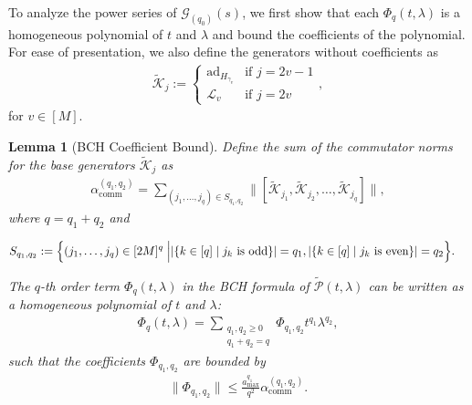 \documentclass[aps,pra,reprint,groupedaddress,floatfix]{revtex4-2}
\newtheorem{lemma}{Lemma}
\newcommand{\ad}{\mathrm{ad}}
\renewcommand{\P}{\mathcal{P}}
\newcommand{\G}{\mathcal{G}}
\renewcommand{\comm}{\mathrm{comm}}
\newcommand{\mc}{\mathcal}
\begin{document}
To analyze the power series of $\G_{(q_0)}(s)$, we first show that each $\Phi_q(t,\lambda)$ is a homogeneous polynomial of $t$ and $\lambda$ and bound the coefficients of the polynomial. For ease of presentation, we also define the generators without coefficients as
\begin{align}
\label{eq:def-K-tilde}
 	\tilde{\mathcal{K}}_j := \begin{cases}\ad_{H_{\gamma_v}} & \text{if } j = 2v-1\\ \mathcal{L}_v & \text{if } j = 2v \end{cases},
\end{align}
for $v \in [M]$.
\begin{lemma}[BCH Coefficient Bound]
\label{lem:bch-bound}
 	Define the sum of the commutator norms for the base generators $\tilde{\mc K}_j$ as
 	\begin{align}
 	\label{eq:alpha-q-q}
 	\alpha_{\comm}^{(q_1, q_2)}=\sum_{(j_1, \ldots, j_q)\in S_{q_1, q_2}}\big\|[\tilde{\mc K}_{j_1}, \tilde{\mc K}_{j_2},\ldots,\tilde{\mc K}_{j_q}]\big\|,
 	\end{align}
 	where $q = q_1+q_2$ and
    \begin{widetext}
 	\begin{align}
 	\label{eq:S-q-q}
 	 	S_{q_1, q_2}:=\Bigl\{(j_1, \ldots, j_q)\in [2M]^q\Bigm| &|\{k\in [q]\mid j_k \text{ is odd}\}|=q_1, |\{k\in [q]\mid j_k \text{ is even}\}|=q_2\Bigr\}. \nonumber
 	\end{align}
    \end{widetext}
 	The $q$-th order term $\Phi_q(t,\lambda)$ in the BCH formula of $\tilde{\P}(t,\lambda)$ can be written as a homogeneous polynomial of $t$ and $\lambda$:
 	\begin{align}
 	\Phi_q(t,\lambda) = \sum_{\substack{q_1, q_2 \ge 0\\q_1+q_2 = q}}\Phi_{q_1, q_2} t^{q_1}\lambda^{q_2},
 	\end{align}
 	such that the coefficients $\Phi_{q_1, q_2}$ are bounded by
 	\begin{align}
 	\|\Phi_{q_1, q_2}\|\le \frac{a_{\max}^{q_1}}{q^2}\alpha_{\comm}^{(q_1, q_2)}.
 	\end{align}
\end{lemma}
\end{document}
